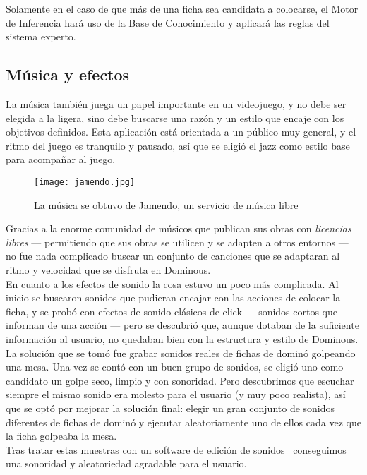 Solamente en el caso de que más de una ficha sea candidata a colocarse, el Motor de Inferencia hará uso de la Base
de Conocimiento y aplicará las reglas del sistema experto.

\subsection{Música y efectos}

La música también juega un papel importante en un videojuego, y no debe ser elegida a la ligera, sino
        debe buscarse una razón y un estilo que encaje con los objetivos definidos. Esta aplicación está orientada a un
        público muy general, y el ritmo del juego es tranquilo y pausado, así que se eligió el jazz como estilo base
        para acompañar al juego.

\begin{figure}[h]
  \label{jamendo}
  \begin{center}
    \texttt{[image: jamendo.jpg]}
  \end{center}
  \caption{La música se obtuvo de Jamendo, un servicio de música libre}
\end{figure}

        Gracias a la enorme comunidad de músicos que publican sus obras con \emph{licencias libres}
        --- permitiendo que sus obras se utilicen y se adapten a otros entornos --- no fue nada complicado buscar
        un conjunto de canciones que se adaptaran al ritmo y velocidad que se disfruta en Dominous. \\

        En cuanto a los efectos de sonido la cosa estuvo un poco más complicada. Al inicio se buscaron sonidos que
        pudieran encajar con las acciones de colocar la ficha, y se probó con efectos de sonido clásicos de click --- sonidos
        cortos que informan de una acción --- pero se descubrió que, aunque dotaban de la suficiente información
        al usuario, no quedaban bien con la estructura y estilo de Dominous. \\

        La solución que se tomó fue grabar sonidos reales de fichas de dominó golpeando una mesa. Una vez se contó con
        un buen grupo de sonidos, se eligió uno como candidato un golpe seco, limpio y con sonoridad. Pero descubrimos
        que escuchar siempre el mismo sonido era molesto para el usuario (y muy poco realista), así que se optó por mejorar
        la solución final: elegir un gran conjunto de sonidos diferentes de fichas de dominó y ejecutar aleatoriamente
        uno de ellos cada vez que la ficha golpeaba la mesa. \\
        
        Tras tratar estas muestras con un software de edición de sonidos~\cite{IPalomo} conseguimos una sonoridad y aleatoriedad agradable para el usuario.
